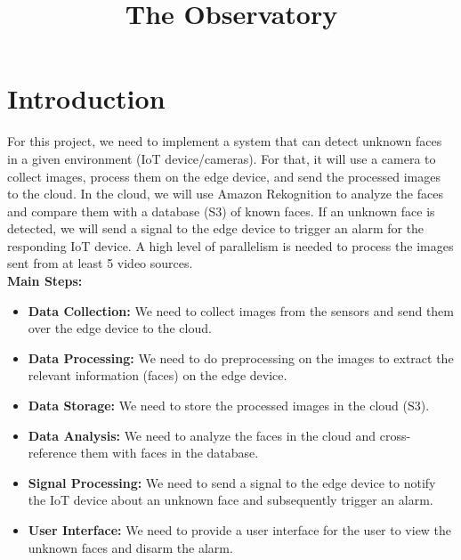 \documentclass[conference]{IEEEtran}
\begin{document}
\title{The Observatory}

\author{
    \and
    \and
}

\maketitle

\section{Introduction}
For this project, we need to implement a system that can detect unknown faces in a given environment (IoT device/cameras).
For that, it will use a camera to collect images, process them on the edge device, and send the processed images to the cloud.
In the cloud, we will use Amazon Rekognition to analyze the faces and compare them with a database (S3) of known faces.
If an unknown face is detected, we will send a signal to the edge device to trigger an alarm for the responding IoT device.
A high level of parallelism is needed to process the images sent from at least 5 video sources.
\\
\textbf{Main Steps:}
\begin{itemize}
    \item \textbf{Data Collection:} We need to collect images from the sensors and send them over the edge device to the cloud.
    \item \textbf{Data Processing:} We need to do preprocessing on the images to extract the relevant information (faces) on the edge device.
    \item \textbf{Data Storage:} We need to store the processed images in the cloud (S3).
    \item \textbf{Data Analysis:} We need to analyze the faces in the cloud and cross-reference them with faces in the database.
    \item \textbf{Signal Processing:} We need to send a signal to the edge device to notify the IoT device about an unknown face and subsequently trigger an alarm.
    \item \textbf{User Interface:} We need to provide a user interface for the user to view the unknown faces and disarm the alarm.
\end{itemize}
\end{document}
